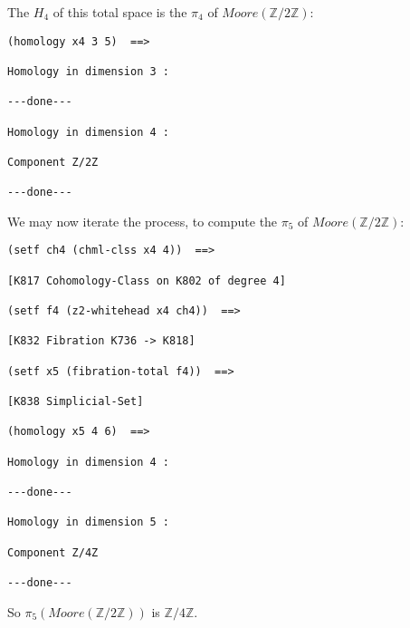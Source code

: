 The $H_4$ of this total space is the $\pi_4$ of $Moore(\mathbb{Z}/2\mathbb{Z})$:
{\footnotesize\begin{verbatim}
(homology x4 3 5)  ==>

Homology in dimension 3 :

---done---

Homology in dimension 4 :

Component Z/2Z

---done---
\end{verbatim}}
We may now iterate the process, to compute the $\pi_5$ of $Moore(\mathbb{Z}/2\mathbb{Z})$:
{\footnotesize\begin{verbatim}
(setf ch4 (chml-clss x4 4))  ==>

[K817 Cohomology-Class on K802 of degree 4]

(setf f4 (z2-whitehead x4 ch4))  ==>

[K832 Fibration K736 -> K818]

(setf x5 (fibration-total f4))  ==>

[K838 Simplicial-Set]

(homology x5 4 6)  ==>

Homology in dimension 4 :

---done---

Homology in dimension 5 :

Component Z/4Z

---done---
\end{verbatim}}
So $\pi_5(Moore(\mathbb{Z}/2\mathbb{Z}))$ is $\mathbb{Z}/4\mathbb{Z}$.
